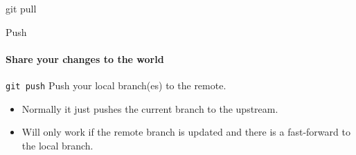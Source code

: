 \documentclass{beamer}
\begin{document}
\begin{frame}{git pull}
\begin{figure}
	\begin{subfigure}[b]{\textwidth}
		\centering
	\end{subfigure}
	
	\begin{subfigure}[b]{\textwidth}
		\centering
	\end{subfigure}
\end{figure}

\end{frame}

\begin{frame}{Push}
\framesubtitle{Share your changes to the world}

\begin{block}{\texttt{git push}}
	Push your local branch(es) to the remote.
\end{block}

\begin{itemize}
	\item Normally it just pushes the current branch to the upstream.
	\item Will only work if the remote branch is updated and there is a fast-forward to the local branch.
\end{itemize}

\end{frame}
\end{document}
